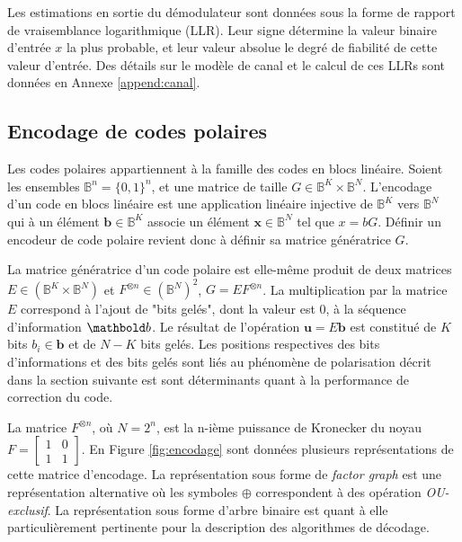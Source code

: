 Les estimations en sortie du démodulateur sont données sous la forme de rapport de vraisemblance logarithmique (LLR). Leur signe détermine la valeur binaire d'entrée $x$ la plus probable, et leur valeur absolue le degré de fiabilité de cette valeur d'entrée. Des détails sur le modèle de canal et le calcul de ces LLRs sont données en Annexe \ref{append:canal}.

\subsection{Encodage de codes polaires}
Les codes polaires appartiennent à la famille des codes en blocs linéaire. Soient les ensembles $\mathbb{B}^n = \{0,1\}^n$, et  une matrice de taille $G \in \mathbb{B}^K \times \mathbb{B}^N$. L'encodage d'un code en blocs linéaire est une application linéaire injective de $\mathbb{B}^K$ vers $\mathbb{B}^N$ qui à un élément $\mathbold{b} \in \mathbb{B}^K$ associe un élément $\mathbold{x} \in \mathbb{B}^N$ tel que $x=bG$. Définir un encodeur de code polaire revient donc à définir sa matrice génératrice $G$. 

La matrice génératrice d'un code polaire est elle-même produit de deux matrices $E \in (\mathbb{B}^K \times \mathbb{B}^N)$ et $F^{\otimes n}\in (\mathbb{B}^N)^2$, $G=EF^{\otimes n}$. La multiplication par la matrice $E$ correspond à l'ajout de "bits gelés", dont la valeur est $0$, à la séquence d'information $\mb{b}$. Le résultat de l'opération $\mathbold{u} = E\mathbold{b}$ est constitué de $K$ bits $b_i \in \mathbold{b}$ et de $N-K$ bits gelés. Les positions respectives des bits d'informations et des bits gelés sont liés au phénomène de polarisation décrit dans la section suivante est sont déterminants quant à la performance de correction du code.

La matrice $F^{\otimes n}$, où $N=2^n$, est la n-ième puissance de Kronecker du noyau $F=\left[\begin{smallmatrix} 1 & 0 \\ 1 & 1\end{smallmatrix}\right]$. En Figure \ref{fig:encodage} sont données plusieurs représentations de cette matrice d'encodage. La représentation sous forme de \textit{factor graph} est une représentation alternative où les symboles $\oplus$ correspondent à des opération \textit{OU-exclusif}. La représentation sous forme d'arbre binaire est quant à elle particulièrement pertinente pour la description des algorithmes de décodage.

